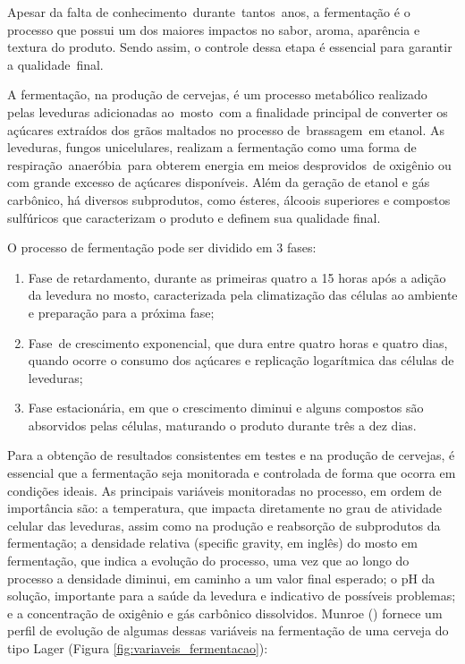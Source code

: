 Apesar da falta de conhecimento durante tantos anos, a fermentação é o processo
que possui um dos maiores impactos no sabor, aroma, aparência e textura do
produto. Sendo assim, o controle dessa etapa é essencial para garantir a
qualidade final.  


A fermentação, na produção de cervejas, é um processo metabólico realizado pelas
leveduras adicionadas ao mosto com a finalidade principal de converter os açúcares
extraídos dos grãos maltados no processo de brassagem em etanol. As leveduras,
fungos unicelulares, realizam a fermentação como uma forma de
respiração anaeróbia para obterem energia em meios desprovidos de oxigênio ou
com grande excesso de açúcares disponíveis. Além da geração de etanol e gás
carbônico, há diversos subprodutos, como ésteres, álcoois superiores e compostos
sulfúricos que caracterizam o produto e definem sua qualidade final. 


O processo de fermentação pode ser dividido em 3 fases:  
\begin{enumerate}
    \item Fase de retardamento, durante as primeiras quatro a 15 horas após a adição
da levedura no mosto, caracterizada pela climatização das células ao
ambiente e preparação para a próxima fase;
    \item Fase de crescimento exponencial, que dura entre quatro horas e quatro dias,
quando ocorre o consumo dos açúcares e replicação logarítmica das células
de leveduras;
    \item Fase estacionária, em que o crescimento diminui e alguns compostos são
absorvidos pelas células, maturando o produto durante três a dez dias.
\end{enumerate}


Para a obtenção de resultados consistentes em testes e na produção de cervejas, é
essencial que a fermentação seja monitorada e controlada de forma que ocorra em
condições ideais. As principais variáveis monitoradas no processo, em ordem de
importância são: a temperatura, que impacta diretamente no grau de atividade
celular das leveduras, assim como na produção e reabsorção de subprodutos da
fermentação; a densidade relativa (specific gravity, em inglês) do mosto em
fermentação, que indica a evolução do processo, uma vez que ao longo do processo
a densidade diminui, em caminho a um valor final esperado; o pH da solução,
importante para a saúde da levedura e indicativo de possíveis problemas; e a
concentração de oxigênio e gás carbônico dissolvidos. Munroe () fornece um
perfil de evolução de algumas dessas variáveis na fermentação de uma cerveja do
tipo Lager (Figura \ref{fig:variaveis_fermentacao}):

